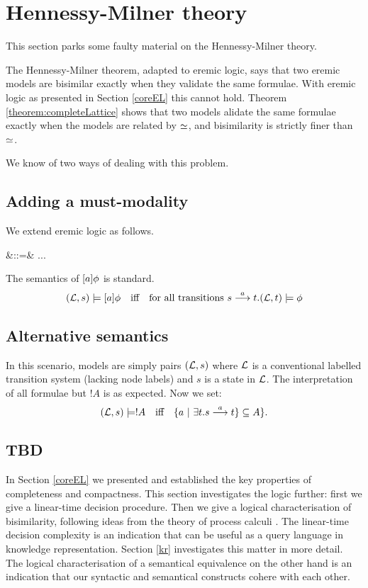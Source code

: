 \section{Hennessy-Milner theory}

This section parks some faulty material on the Hennessy-Milner theory.

The Hennessy-Milner theorem, adapted to eremic logic, says that two
eremic models are bisimilar exactly when they validate the same
formulae. With eremic logic as presented in Section \ref{coreEL} this
cannot hold. Theorem \ref{theorem:completeLattice} shows that two
models alidate the same formulae exactly when the models are related
by $\simeq$, and bisimilarity is strictly finer than $\simeq$.

We know of two ways of dealing with this problem.

\subsection{Adding a must-modality}

We extend eremic logic as follows.
\begin{GRAMMAR}
  \phi
     &::=&
  ...
     \VERTICAL
\end{GRAMMAR}

\NI The semantics of $[ a ] \phi$ is standard.
\[
   (\mathcal{L}, s) \models [ a ] \phi
      \quad\text{iff}\quad
   \text{for all transitions}\ s \stackrel{a}{\longrightarrow} t. (\mathcal{L}, t) \models \phi
\]

\subsection{Alternative semantics}

In this scenario, models are simply pairs $(\mathcal{L}, s)$
where $\mathcal{L}$ is a conventional labelled transition system (lacking node
labels) and $s$ is a state in $\mathcal{L}$. The interpretation of all formulae but
$!A$ is as expected. Now we set:
\[
   (\mathcal{L}, s) \models !A
      \quad\text{iff}\quad
   \{a \ |\ \exists t.s \stackrel{a}{\longrightarrow} t\} \subseteq A\}.
\]


\subsection{TBD}

In Section \ref{coreEL} we presented \ELABR{}
and established the key properties of completeness and compactness.
This section investigates
the logic further: first we give a linear-time decision
procedure. Then we give a logical characterisation of bisimilarity,
following ideas from the theory of process calculi
\cite{HennessyM:alglawfndac}.  The linear-time decision complexity is
an indication that \ELABR{} can be useful as a query language in
knowledge representation. Section \ref{kr} investigates this matter in
more detail. The logical characterisation of a semantical equivalence
on the other hand is an indication that our syntactic and semantical
constructs cohere with each other.


